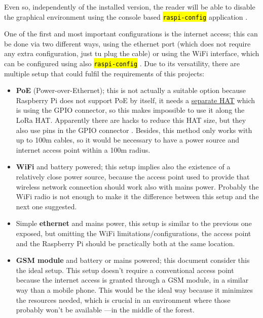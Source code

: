 \documentclass[11pt,a4paper,dvipsnames,twoside]{article}
\newcommand{\cmd}[1] {\hl{\texttt{#1}}}
\begin{document}
Even so, independently of the installed version, the reader will be able to disable the graphical environment using the console based \cmd{raspi-config} application \cite{RaspiConf}. 

One of the first and most important configurations is the internet access; this can be done via two different ways, using the ethernet port (which does not require any extra configuration, just tu plug the cable) or using the WiFi interface, which can be configured using also \cmd{raspi-config} \cite{RaspiWIFIcli}. Due to its versatility, there are multiple setup that could fulfil the requirements of this projects:

\begin{itemize}
  \item \textbf{PoE} (Power-over-Ethernet); this is not actually a suitable option because Raspberry Pi does not support PoE by itself, it needs a \href{https://www.raspberrypi.org/products/poe-hat/}{separate HAT} which is using the GPIO connector, so this makes impossible to use it along the LoRa HAT. Apparently there are hacks to reduce this HAT size, but they also use pins in the GPIO connector \cite{RaspiPoEHack}. Besides, this method only works with up to 100m cables, so it would be necessary to have a power source and internet access point within a 100m radius.
  \item \textbf{WiFi} and battery powered; this setup implies also the existence of a relatively close power source, because the access point used to provide that wireless network connection should work also with mains power. Probably the WiFi radio is not enough to make it the difference between this setup and the next one suggested.
  \item Simple \textbf{ethernet} and mains power, this setup is similar to the previous one exposed, but omitting the WiFi limitations/configurations, the access point and the Raspberry Pi should be practically both at the same location.
  \item \textbf{GSM module} and battery or mains powered; this document consider this the ideal setup. This setup doesn't require a conventional access point because the internet access is granted through a GSM module, in a similar way than a mobile phone. This would be the ideal way because it minimizes the resources needed, which is crucial in an environment where those probably won't be available ---in the middle of the forest.
  

\end{itemize}
\end{document}
